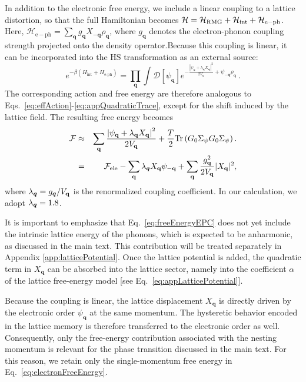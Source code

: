 \documentclass[aps,prx,article,twocolumn,amsmath,amssymb,superscriptaddress,longbibliography]{revtex4-2}
\begin{document}
In addition to the electronic free energy, we include a linear coupling to a lattice distortion, so that the full Hamiltonian becomes $\mathcal{H}=\mathcal{H}_{\rm RMG}+\mathcal{H}_{\mathrm{int}}+\mathcal{H}_{\mathrm{e-ph}}$. Here, $\mathcal{H}_{\mathrm{e-ph}}=\sum_{\mathbf q}g_{\mathbf q}X_{-\mathbf q}\rho_{\mathbf q}$, where $g_{\mathbf q}$ denotes the electron-phonon coupling strength projected onto the density operator.Because this coupling is linear, it can be incorporated into the HS transformation as an external source:
\begin{equation}
e^{-\beta (H_{\mathrm{int}}+H_{\mathrm{e\text{-}ph}})}
=\prod_{\mathbf q}\int\mathcal D[\psi_{\mathbf q}] e^{-\frac{\left|\psi_{\mathbf q}+\lambda_{\mathbf q}X_{\mathbf q}\right|^2}{2V_{\mathbf q}}+\psi_{-\mathbf q}\rho_{\mathbf q}}\,.
\end{equation}
The corresponding action and free energy are therefore analogous to Eqs.~\eqref{eq:effAction}-\eqref{eq:appQuadraticTrace}, except for the shift induced by the lattice field. The resulting free energy becomes
\begin{eqnarray}\label{eq:freeEnergyEPC}
\mathcal F&\approx&\sum_{\mathbf q}\frac{\left|\psi_{\mathbf q}+\lambda_{\mathbf q}X_{\mathbf q}\right|^2}{2V_{\mathbf q}}+\frac{T}{2}\mathrm{Tr}\left( G_0\Sigma_\psi G_0\Sigma_\psi \right).\nonumber\\
&=&\mathcal F_{\mathrm{ele}}-\sum_{\mathbf q} \lambda_{\vb*{q}} X_{\mathbf q}\psi_{-\mathbf q} + \sum_{\mathbf q}\frac{g_{\mathbf q}^2}{2V_{\mathbf q}}|X_{\mathbf q}|^2,
\end{eqnarray}
where $\lambda_{\vb*{q}} = g_{\vb*{q}} / V_{\mathbf q}$ is the renormalized coupling coefficient. In our calculation, we adopt $\lambda_{\vb*{q}} = 1.8$. 

It is important to emphasize that Eq.~\eqref{eq:freeEnergyEPC} does not yet include the intrinsic lattice energy of the phonons, which is expected to be anharmonic, as discussed in the main text. This contribution will be treated separately in Appendix \ref{app:latticePotential}. Once the lattice potential is added, the quadratic term in $X_{\mathbf q}$ can be absorbed into the lattice sector, namely into the coefficient $\alpha$ of the lattice free-energy model [see Eq.~\eqref{eq:appLatticePotential}].

Because the coupling is linear, the lattice displacement $X_{\mathbf q}$ is directly driven by the electronic order $\psi_{\mathbf q}$ at the same momentum. The hysteretic behavior encoded in the lattice memory is therefore transferred to the electronic order as well. Consequently, only the free-energy contribution associated with the nesting momentum is relevant for the phase transition discussed in the main text. For this reason, we retain only the single-momentum free energy in Eq.~\eqref{eq:electronFreeEnergy}.
\end{document}
